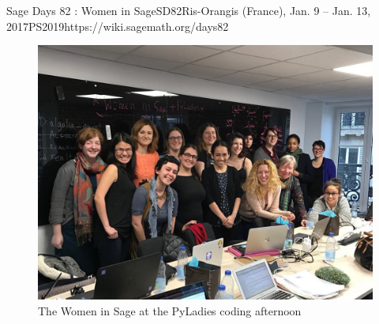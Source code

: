 \begin{event}{Sage Days 82 : Women in Sage}{SD82}{Ris-Orangis (France), Jan. 9 -- Jan. 13, 2017}{PS}{20}{19}{https://wiki.sagemath.org/days82}
\begin{figure}[ht]
\includegraphics[scale=.2]{pyladies-WIS.jpg}
\caption*{The Women in Sage at the PyLadies coding afternoon}
\end{figure}



\end{event}
